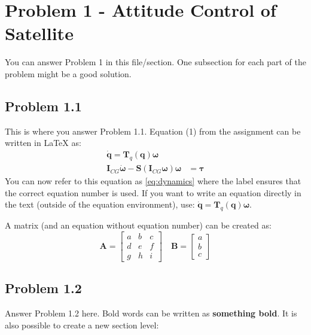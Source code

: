 \section*{Problem 1 - Attitude Control of Satellite}
You can answer Problem 1 in this file/section. One subsection for each part of the problem might be a good solution. 

\subsection*{Problem 1.1} 
This is where you answer Problem 1.1. Equation (1) from the assignment can be written in \LaTeX{} as:
\begin{equation}
\label{eq:dynamics}		%
	\begin{aligned}
		\dot{\mathbf{q}} = \mathbf{T}_q (\mathbf{q} ) \boldsymbol{\omega} \\
		\mathbf{I}_{CG} \dot{\boldsymbol{\omega}} - \mathbf{S} (\mathbf{I}_{CG} \boldsymbol{\omega} ) \boldsymbol{\omega} & =  \boldsymbol{\tau}
	\end{aligned}	
\end{equation}
You can now refer to this equation as \eqref{eq:dynamics} where the label ensures that the correct equation number is used. If you want to write an equation directly in the text (outside of the equation environment), use: $\dot{\mathbf{q}} = \mathbf{T}_q (\mathbf{q} ) \boldsymbol{\omega}$. %

A matrix (and an equation without equation number) can be created as: 
\begin{equation*}	%
	\mathbf{A} = 
	\begin{bmatrix}
		a & b & c \\ d & e & f \\ g & h & i
	\end{bmatrix} \quad
	\mathbf{B} = 
	\begin{bmatrix}
		a \\ b \\ c
	\end{bmatrix}
\end{equation*}

\subsection*{Problem 1.2}
Answer Problem 1.2 here. Bold words can be written as \textbf{something bold}. It is also possible to create a new section level:
